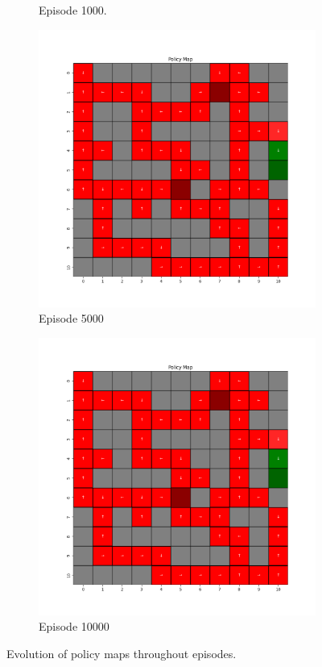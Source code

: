 \documentclass{assignment}
\begin{document}
\begin{figure}[H]
\begin{subfigure}{0.3\textwidth}
    \caption{Episode 1000.}
    \end{subfigure}\hfill
    \begin{subfigure}{0.3\textwidth}
        \includegraphics[width=\textwidth]{figures/policy_q/gamma_sweep/policy_alpha_0.1_gamma_0.1_epsilon_0.2_iteration_5000.png}
    \caption{Episode 5000}
    \end{subfigure}\hfill
    \begin{subfigure}{0.3\textwidth}
        \includegraphics[width=\textwidth]{figures/policy_q/gamma_sweep/policy_alpha_0.1_gamma_0.1_epsilon_0.2_iteration_10000.png}
    \caption{Episode 10000}
    \end{subfigure}
    \caption{Evolution of policy maps throughout episodes.}
    \label{fig:gamma_0.1_q_learning_policy}
\end{figure}
\end{document}
